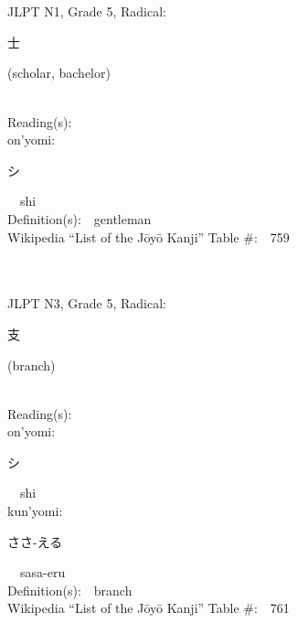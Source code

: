 \begin{multicols}{2}
\ \ \\
{\fontsize{34pt}{40pt}  }\ \ \\  %
{JLPT N1, Grade 5, Radical:\ \ {\begin{CJK}{UTF8}{min} 士 \end{CJK}} (scholar, bachelor) } \\
Reading(s):\ \ \\
{\hspace*{1em}}on'yomi:\ \ \\
{\hspace*{2em}}{\begin{CJK}{UTF8}{min} シ \end{CJK}}\ \ shi\ \ \\
Definition(s):\ \ gentleman \\
Wikipedia ``List of the J\=oy\=o Kanji'' Table \#:\ \ 759 \\
\ \ \\
{\fontsize{34pt}{40pt}  }\ \ \\  %
{JLPT N3, Grade 5, Radical:\ \ {\begin{CJK}{UTF8}{min} 支 \end{CJK}} (branch) } \\
Reading(s):\ \ \\
{\hspace*{1em}}on'yomi:\ \ \\
{\hspace*{2em}}{\begin{CJK}{UTF8}{min} シ \end{CJK}}\ \ shi\ \ \\
{\hspace*{1em}}kun'yomi:\ \ \\
{\hspace*{2em}}{\begin{CJK}{UTF8}{min} ささ-える \end{CJK}}\ \ sasa-eru\ \ \\
Definition(s):\ \ branch \\
Wikipedia ``List of the J\=oy\=o Kanji'' Table \#:\ \ 761 \\
\ \ \\
{\fontsize{34pt}{40pt}  }\ \ \\  %

\end{multicols}
